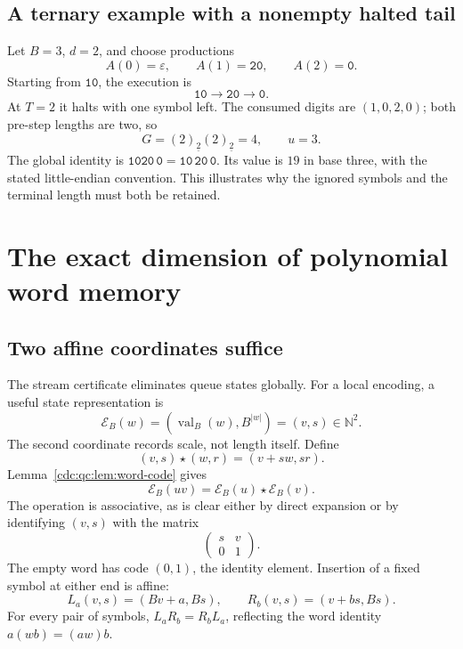 \documentclass[11pt,a4paper]{article}
\theoremstyle{definition}
\theoremstyle{remark}
\newcommand{\N}{\mathbb N}
\newcommand{\eps}{\varepsilon}
\newcommand{\val}{\operatorname{val}}
\newcommand{\ff}[2]{(#1)_{\underline{#2}}}
\newcommand{\word}[1]{\mathtt{#1}}
\newcommand{\srctag}[1]{\texorpdfstring{\hspace{0.5em}{\normalfont\small\color{accent}[#1]}}{ [#1]}}
\begin{document}
\subsection{A ternary example with a nonempty halted tail}
Let $B=3$, $d=2$, and choose productions
\[
 A(0)=\eps,\qquad A(1)=\word{20},\qquad A(2)=\word{0}.
\]
Starting from $\word{10}$, the execution is
\[
 \word{10}\longrightarrow\word{20}\longrightarrow\word{0}.
\]
At $T=2$ it halts with one symbol left. The consumed digits are $(1,0,2,0)$; both pre-step lengths are two, so
\[
 G=\ff{2}{2}\ff{2}{2}=4,\qquad u=3.
\]
The global identity is $\word{1020}\,\word{0}=\word{10}\,\word{20}\,\word{0}$. Its value is $19$ in base three, with the stated little-endian convention. This illustrates why the ignored symbols and the terminal length must both be retained.

\section{The exact dimension of polynomial word memory\srctag{07}}\label{cdc:qc:sec:memory}
\subsection{Two affine coordinates suffice}
The stream certificate eliminates queue states globally. For a local encoding, a useful state representation is
\begin{equation}\label{cdc:qc:eq:word-pair}
 \mathcal E_B(w)=(\val_B(w),B^{|w|})=(v,s)\in\N^2.
\end{equation}
The second coordinate records scale, not length itself. Define
\begin{equation}\label{cdc:qc:eq:star}
 (v,s)\star(w,r)=(v+sw,sr).
\end{equation}
Lemma~\ref{cdc:qc:lem:word-code} gives
\[
 \mathcal E_B(uv)=\mathcal E_B(u)\star\mathcal E_B(v).
\]
The operation is associative, as is clear either by direct expansion or by identifying $(v,s)$ with the matrix
\[
 \begin{pmatrix}s&v\\0&1\end{pmatrix}.
\]
The empty word has code $(0,1)$, the identity element. Insertion of a fixed symbol at either end is affine:
\begin{equation}\label{cdc:qc:eq:insertion-pair}
 L_a(v,s)=(Bv+a,Bs),\qquad R_b(v,s)=(v+bs,Bs).
\end{equation}
For every pair of symbols, $L_aR_b=R_bL_a$, reflecting the word identity $a(wb)=(aw)b$.
\end{document}
